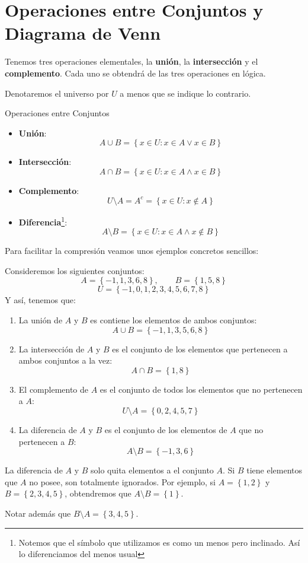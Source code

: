 \documentclass[12pt, twoside]{book}
\newcommand{\set}[1]{\left\lbrace #1 \right\rbrace}
\begin{document}
\section{Operaciones entre Conjuntos y Diagrama de Venn}
Tenemos tres operaciones elementales, la \textbf{unión}, la \textbf{intersección} y el \textbf{complemento}. Cada uno se obtendrá de las tres operaciones en lógica.

Denotaremos el universo por \(U\) a menos que se indique lo contrario.
\begin{definition}{Operaciones entre Conjuntos}
    \begin{itemize}[label=\(\bullet\)]
        \item \textbf{Unión}: 
            \[A\cup B=\set{x\in U: x\in A\vee x\in B}\]
        \item \textbf{Intersección}: 
            \[A\cap B=\set{x\in U: x\in A\wedge x\in B}\]

        \item \textbf{Complemento}:
            \[U\setminus A=A^c=\set{x\in U: x\notin A}\]
        \item \textbf{Diferencia}\footnote{Notemos que el símbolo que utilizamos es como un menos pero inclinado. Así lo diferenciamos del menos usual}:
            \[A\setminus B=\set{x\in U: x\in A\wedge x\notin B}\]
    \end{itemize}
\end{definition}
Para facilitar la compresión veamos unos ejemplos concretos sencillos:
\begin{example}
    Consideremos los siguientes conjuntos:
    \[A=\set{-1,1,3,6,8},\qquad B=\set{1,5,8}\]
    \[U=\set{-1,0,1,2,3,4,5,6,7,8}\]
    Y así, tenemos que:
    \begin{enumerate}[label=\alph*)]
        \item La unión de \(A\) y \(B\) es contiene los elementos de ambos conjuntos:
            \[A\cup B=\set{-1,1,3,5,6,8}\]
        \item La intersección de \(A\) y \(B\) es el conjunto de los elementos que pertenecen a ambos conjuntos a la vez:
            \[A\cap B=\set{1,8}\]
        \item El complemento de \(A\) es el conjunto de todos los elementos que no pertenecen a \(A\):
            \[U\setminus A=\set{0,2,4,5,7}\]
        \item La diferencia de \(A\) y \(B\) es el conjunto de los elementos de \(A\) que no pertenecen a \(B\):
            \[A\setminus B=\set{-1,3,6}\]
    \end{enumerate}
\end{example}
\begin{note}
    La diferencia de \(A\) y \(B\) solo quita elementos a el conjunto \(A\). Si \(B\) tiene elementos que \(A\) no posee, son totalmente ignorados. Por ejemplo, si \({A=\set{1,2}}\) y \({B=\set{2,3,4,5}}\), obtendremos que \({A\setminus B=\set{1}}\).


Notar además que \(B\setminus A=\set{3,4,5}\).
\end{note}
\end{document}
